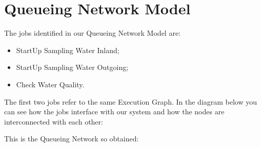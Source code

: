 \chapter{\textbf{Queueing Network Model}}

The jobs identified in our Queueing Network Model are:
\begin{itemize}
\item StartUp Sampling Water Inland;
\item StartUp Sampling Water Outgoing;
\item Check Water Quality.
\end{itemize}

The first two jobs refer to the same Execution Graph.
In the diagram below you can see how the jobs interface with our system and how the nodes are interconnected with each other:

\bigskip
\begin{center}
\end{center}
\bigskip
{}
\bigskip

This is the Queueing Network so obtained:

\begin{center}
\end{center}
\bigskip
{}

